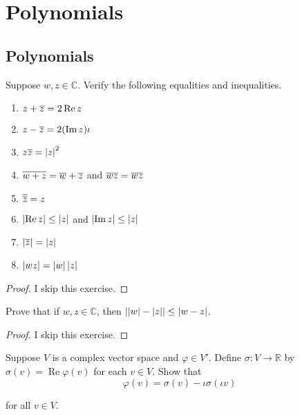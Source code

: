 \chapter{Polynomials}

\section{Polynomials}

\begin{exercise}
    Suppose $w, z \in \mathbb{C}$. Verify the following equalities and inequalities.
    \begin{enumerate}[label={(\alph*)}]
        \item $z + \overline{z} = 2\operatorname{Re}z$
        \item $z - \overline{z} = 2(\operatorname{Im}z)\iota$
        \item $z\overline{z} = \left\vert{z}\right\vert^{2}$
        \item $\overline{w+z} = \overline{w} + \overline{z}$ and $\overline{wz} = \overline{w}\overline{z}$
        \item $\overline{\overline{z}} = z$
        \item $\left\vert{\operatorname{Re}z}\right\vert\leq \left\vert{z}\right\vert$ and $\left\vert{\operatorname{Im}z}\right\vert\leq \left\vert{z}\right\vert$
        \item $\left\vert{\overline{z}}\right\vert = \left\vert{z}\right\vert$
        \item $\left\vert{wz}\right\vert = \left\vert{w}\right\vert\left\vert{z}\right\vert$
    \end{enumerate}
\end{exercise}

\begin{proof}
    I skip this exercise.
\end{proof}
\newpage

\begin{exercise}
    Prove that if $w, z\in\mathbb{C}$, then $\left\vert{\left\vert{w}\right\vert - \left\vert{z}\right\vert}\right\vert\leq \left\vert{w - z}\right\vert$.
\end{exercise}

\begin{proof}
    I skip this exercise.
\end{proof}
\newpage

\begin{exercise}
    Suppose $V$ is a complex vector space and $\varphi\in V'$. Define $\sigma: V\to \mathbb{R}$ by $\sigma(v) = \operatorname{Re} \varphi(v)$ for each $v\in V$. Show that
    \[
        \varphi(v) = \sigma(v) - \iota\sigma(\iota v)
    \]

    for all $v\in V$.
\end{exercise}

